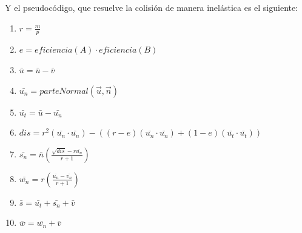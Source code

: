 Y el pseudocódigo, que resuelve la colisión de manera inelástica es el siguiente:
\begin{enumerate}
 \item $r = \frac{m}{p}$
 \item $e = eficiencia(A) \cdot eficiencia(B)$
 \item $\bar{u} = \bar{u} - \bar{v}$
 \item $\bar{u_n} = parteNormal(\vec{u}, \vec{n})$
 \item $\bar{u_t} = \bar{u} - \bar{u_n}$
 \item $ dis = r^{2} \left(  \bar{u_n} \cdot \bar{u_n} \right) - \left( (r - e) (\bar{u_n} \cdot \bar{u_n}) + (1 - e) (\bar{u_t} \cdot \bar{u_t}) \right) $
 \item $\bar{s_n} = \bar{n} \left( \frac{ \sqrt{dis} - r \bar{u_n} }{r + 1} \right) $
 \item $\bar{w_n} = r \left( \frac{\bar{u_n} - \bar{v_n}}{r + 1} \right) $
 \item $\bar{s} = \bar{u_t} + \bar{s_n} + \bar{v}$
 \item $\bar{w} = \bar{w_n} + \bar{v}$
\end{enumerate}